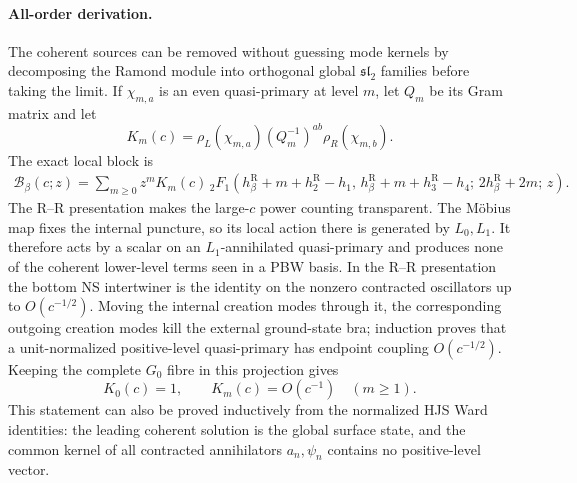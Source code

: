 \documentclass[11pt]{article}
\newcommand{\R}{\mathrm{R}}
\begin{document}
\paragraph{All-order derivation.}
The coherent sources can be removed without guessing mode kernels by
decomposing the Ramond module into orthogonal global
\(\mathfrak{sl}_2\) families before taking the limit.  If
\(\chi_{m,a}\) is an even quasi-primary at level \(m\), let \(Q_m\) be
its Gram matrix and let
\[
 K_m(c)=
 \rho_L(\chi_{m,a})(Q_m^{-1})^{ab}\rho_R(\chi_{m,b}).
\]
The exact local block is
\begin{align}
 \mathcal B_\beta(c;z)
 =
 \sum_{m\ge0}z^m K_m(c)\,
 {}_2F_1\left(
 h_\beta^\R+m+h_2^\R-h_1,\,
 h_\beta^\R+m+h_3^\R-h_4;\,
 2h_\beta^\R+2m;\,z\right).
 \label{eq:fixed-beta-r-global-family-decomposition}
\end{align}
The R--R presentation makes the large-\(c\) power counting transparent.
The Möbius map fixes the internal puncture, so its local action there is
generated by \(L_0,L_1\).  It therefore acts by a scalar on an
\(L_1\)-annihilated quasi-primary and produces none of the coherent
lower-level terms seen in a PBW basis.  In the R--R presentation the
bottom NS intertwiner is the identity on the nonzero contracted
oscillators up to \(O(c^{-1/2})\).  Moving the internal creation modes
through it, the corresponding outgoing creation modes kill the external
ground-state bra; induction proves that a unit-normalized positive-level
quasi-primary has endpoint coupling \(O(c^{-1/2})\).
Keeping the complete \(G_0\) fibre in this projection gives
\begin{equation}
 K_0(c)=1,
 \qquad
 K_m(c)=O(c^{-1})\quad(m\ge1).
 \label{eq:fixed-beta-r-quasiprimary-suppression}
\end{equation}
This statement can also be proved inductively from the normalized HJS
Ward identities: the leading coherent solution is the global surface
state, and the common kernel of all contracted annihilators
\(a_n,\psi_n\) contains no positive-level vector.
\end{document}
